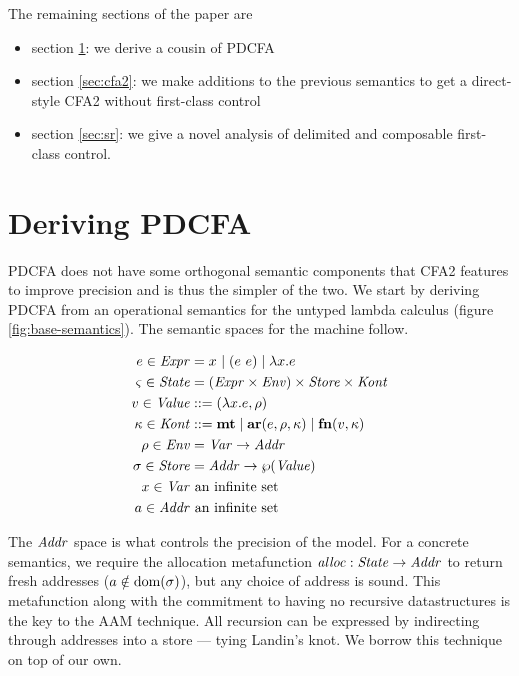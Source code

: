 \documentclass{llncs}
\begin{document}
The remaining sections of the paper are
\begin{itemize}
\item{section \ref{sec:pdcfa}: we derive a cousin of PDCFA}
\item{section \ref{sec:cfa2}: we make additions to the previous semantics to get a direct-style CFA2 without first-class control}
\item{section \ref{sec:sr}: we give a novel analysis of delimited and composable first-class control.}
\end{itemize}

\section{Deriving PDCFA}
\label{sec:pdcfa}

PDCFA does not have some orthogonal semantic components that CFA2
features to improve precision and is thus the simpler of the two. We
start by deriving PDCFA from an operational semantics for the untyped
lambda calculus (figure \ref{fig:base-semantics}). The semantic spaces
for the machine follow.

\begin{align*}
  e \in \mathit{Expr} &= x^{{}} \mid (e\ e){} \mid \lambda{} x. e \\
  \varsigma \in \mathit{State} &= (\mathit{Expr} \times \mathit{Env}) \times \mathit{Store} \times \mathit{Kont} \\
  v \in \mathit{Value} &::= (\lambda{} x. e, \rho) \\
  \kappa \in \mathit{Kont} &::= \mathbf{mt} \mid \mathbf{ar}{}(e,\rho,\kappa) \mid \mathbf{fn}{}(v,\kappa) \\
  \rho \in \mathit{Env} &= \mathit{Var} \to \mathit{Addr} \\
  \sigma \in \mathit{Store} &= \mathit{Addr} \to \wp(\mathit{Value}) \\
  x \in \mathit{Var} &\text{ an infinite set} \\
  a \in \mathit{Addr} &\text{ an infinite set}
\end{align*}

The $\mathit{Addr}$ space is what controls the precision of the model. For a
concrete semantics, we require the allocation metafunction $\mathit{alloc} :
\mathit{State} \to \mathit{Addr}$ to return fresh addresses ($a \notin
\text{dom}(\sigma)$), but any choice of address is sound. This metafunction
along with the commitment to having no recursive datastructures is the
key to the AAM technique. All recursion can be expressed by
indirecting through addresses into a store --- tying Landin's knot. We
borrow this technique on top of our own.
\end{document}
